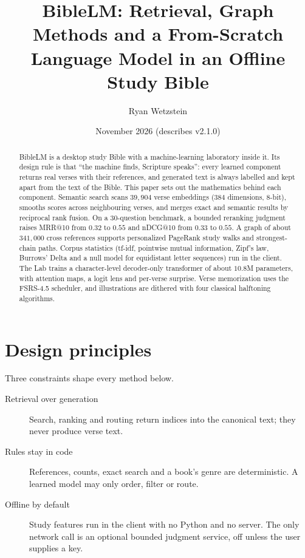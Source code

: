 \documentclass[11pt]{article}
\title{BibleLM: Retrieval, Graph Methods and a From-Scratch\\Language Model in an Offline Study Bible}
\author{Ryan Wetzstein}
\date{November 2026 \quad (describes v2.1.0)}
\begin{document}
\maketitle

\begin{abstract}
BibleLM is a desktop study Bible with a machine-learning laboratory inside it.
Its design rule is that \enquote{the machine finds, Scripture speaks}: every
learned component returns real verses with their references, and generated text
is always labelled and kept apart from the text of the Bible. This paper sets out
the mathematics behind each component. Semantic search scans $39{,}904$
verse embeddings ($384$ dimensions, $8$-bit), smooths scores across neighbouring
verses, and merges exact and semantic results by reciprocal rank fusion. On a
$30$-question benchmark, a bounded reranking judgment raises MRR@10 from $0.32$
to $0.55$ and nDCG@10 from $0.33$ to $0.55$. A graph of about $341{,}000$ cross
references supports personalized PageRank study walks and strongest-chain paths.
Corpus statistics (tf-idf, pointwise mutual information, Zipf's law, Burrows'
Delta and a null model for equidistant letter sequences) run in the client. The
Lab trains a character-level decoder-only transformer of about $10.8$M
parameters, with attention maps, a logit lens and per-verse surprise. Verse
memorization uses the FSRS-4.5 scheduler, and illustrations are dithered with
four classical halftoning algorithms.
\end{abstract}

\tableofcontents

\section{Design principles}\label{sec:principles}

Three constraints shape every method below.
\begin{description}
  \item[Retrieval over generation] Search, ranking and routing return indices
        into the canonical text; they never produce verse text.
  \item[Rules stay in code] References, counts, exact search and a book's
        genre are deterministic. A learned model may only order, filter or
        route.
  \item[Offline by default] Study features run in the client with no Python
        and no server. The only network call is an optional bounded judgment
        service, off unless the user supplies a key.
\end{description}
\end{document}
